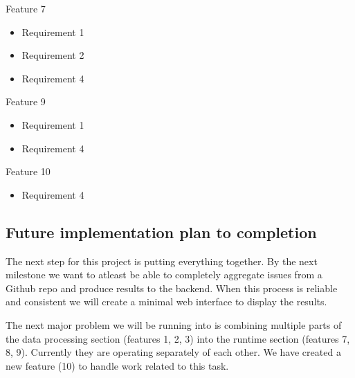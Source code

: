 \documentclass[11pt,]{article}
\providecommand{\tightlist}{%
  \setlength{\itemsep}{0pt}\setlength{\parskip}{0pt}}
\begin{document}
Feature 7

\begin{itemize}
\tightlist
\item
  Requirement 1
\item
  Requirement 2
\item
  Requirement 4
\end{itemize}

Feature 9

\begin{itemize}
\tightlist
\item
  Requirement 1
\item
  Requirement 4
\end{itemize}

Feature 10

\begin{itemize}
\tightlist
\item
  Requirement 4
\end{itemize}

\hypertarget{future-implementation-plan-to-completion}{%
\subsection{Future implementation plan to
completion}\label{future-implementation-plan-to-completion}}

The next step for this project is putting everything together. By the
next milestone we want to atleast be able to completely aggregate issues
from a Github repo and produce results to the backend. When this process
is reliable and consistent we will create a minimal web interface to
display the results.

The next major problem we will be running into is combining multiple
parts of the data processing section (features 1, 2, 3) into the runtime
section (features 7, 8, 9). Currently they are operating separately of
each other. We have created a new feature (10) to handle work related to
this task.
\end{document}
